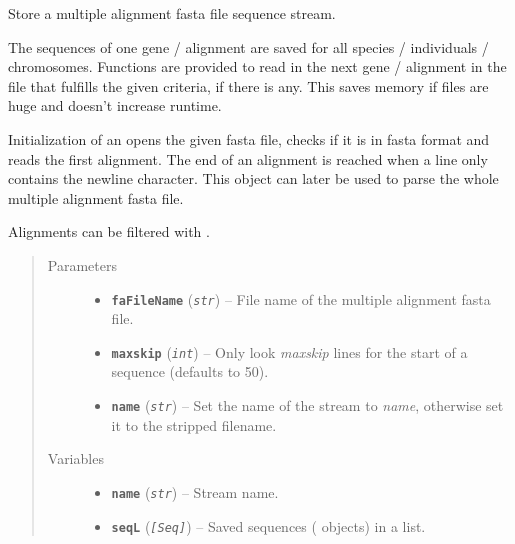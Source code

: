 \documentclass[letterpaper,10pt,english]{sphinxmanual}
\begin{document}
\begin{fulllineitems}
\label{fasta:libPoMo.fasta.MFaStream}
Store a multiple alignment fasta file sequence stream.

The sequences of one gene / alignment are saved for all species /
individuals / chromosomes.  Functions are provided to read in the
next gene / alignment in the file that fulfills the given
criteria, if there is any.  This saves memory if files are huge and
doesn't increase runtime.

Initialization of an {\hyperref[fasta:libPoMo.fasta.MFaStream]{}} opens the given fasta
file, checks if it is in fasta format and reads the first
alignment.  The end of an alignment is reached when a line only
contains the newline character.  This object can later be used to
parse the whole multiple alignment fasta file.

Alignments can be filtered with {\hyperref[fasta:libPoMo.fasta.filter_mfa_str]{}}.
\begin{quote}\begin{description}
\item[{Parameters}] \leavevmode\begin{itemize}
\item {} 
\textbf{\texttt{faFileName}} (\emph{\texttt{str}}) -- File name of the multiple alignment fasta file.

\item {} 
\textbf{\texttt{maxskip}} (\emph{\texttt{int}}) -- Only look \emph{maxskip} lines for the start of a
sequence (defaults to 50).

\item {} 
\textbf{\texttt{name}} (\emph{\texttt{str}}) -- Set the name of the stream to \emph{name}, otherwise
set it to the stripped filename.

\end{itemize}

\item[{Variables}] \leavevmode\begin{itemize}
\item {} 
\textbf{\texttt{name}} (\emph{\texttt{str}}) -- Stream name.

\item {} 
\textbf{\texttt{seqL}} (\emph{\texttt{{[}Seq{]}}}) -- Saved sequences ({\hyperref[seqbase:libPoMo.seqbase.Seq]{}} objects) in a list.


\end{itemize}
\end{description}
\end{quote}
\end{fulllineitems}
\end{document}
